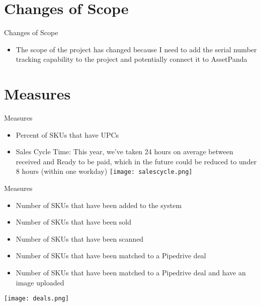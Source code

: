 \documentclass[aspectratio=1610]{beamer}
\begin{document}
\section{Changes of Scope}
\begin{frame}{Changes of Scope}
    \begin{itemize}
        \item The scope of the project has changed because I need to add the serial number tracking capability to the project and potentially connect it to AssetPanda 
    \end{itemize}
\end{frame}
\section{Measures}
\begin{frame}{Measures}
    \begin{itemize}
        \item Percent of SKUs that have UPCs 
        \item Sales Cycle Time: This year, we've taken 24 hours on average between received and Ready to be paid, which in the future could be reduced to under 8 hours (within one workday) 
        \texttt{[image: salescycle.png]}
    \end{itemize}
\end{frame}
\begin{frame}{Measures}
    \begin{itemize}
        \item Number of SKUs that have been added to the system
        \item Number of SKUs that have been sold
        \item Number of SKUs that have been scanned
        \item Number of SKUs that have been matched to a Pipedrive deal
        \item Number of SKUs that have been matched to a Pipedrive deal and have an image uploaded
    \end{itemize}
    \texttt{[image: deals.png]}

\end{frame}
\end{document}
